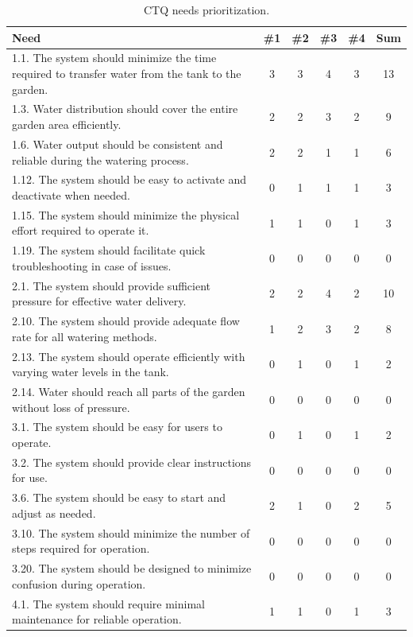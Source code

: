\documentclass[12pt]{report}
\begin{document}
\begin{table}[H]
\centering
\caption{ CTQ needs prioritization.}
\begin{tabular}{|p{10cm}|c|c|c|c|c|}
\hline
\textbf{Need} & \textbf{\#1} & \textbf{\#2} & \textbf{\#3} & \textbf{\#4} & \textbf{Sum} \\
\hline
1.1. The system should minimize the time required to transfer water from the tank to the garden. & 3 & 3 & 4 & 3 & 13 \cellcolor{yellow} \\
1.3. Water distribution should cover the entire garden area efficiently. & 2 & 2 & 3 & 2 & 9 \cellcolor{yellow} \\
1.6. Water output should be consistent and reliable during the watering process. & 2 & 2 & 1 & 1 & 6 \\
1.12. The system should be easy to activate and deactivate when needed. & 0 & 1 & 1 & 1 & 3 \\
1.15. The system should minimize the physical effort required to operate it. & 1 & 1 & 0 & 1 & 3 \\
1.19. The system should facilitate quick troubleshooting in case of issues. & 0 & 0 & 0 & 0 & 0 \\
\hline
2.1. The system should provide sufficient pressure for effective water delivery. & 2 & 2 & 4 & 2 & 10 \cellcolor{yellow} \\
2.10. The system should provide adequate flow rate for all watering methods. & 1 & 2 & 3 & 2 & 8 \cellcolor{yellow} \\
2.13. The system should operate efficiently with varying water levels in the tank. & 0 & 1 & 0 & 1 & 2 \\
2.14. Water should reach all parts of the garden without loss of pressure. & 0 & 0 & 0 & 0 & 0 \\
\hline
3.1. The system should be easy for users to operate. & 0 & 1 & 0 & 1 & 2 \\
3.2. The system should provide clear instructions for use. & 0 & 0 & 0 & 0 & 0 \\
3.6. The system should be easy to start and adjust as needed. & 2 & 1 & 0 & 2 & 5 \\
3.10. The system should minimize the number of steps required for operation. & 0 & 0 & 0 & 0 & 0 \\
3.20. The system should be designed to minimize confusion during operation. & 0 & 0 & 0 & 0 & 0 \\
\hline
4.1. The system should require minimal maintenance for reliable operation. & 1 & 1 & 0 & 1 & 3 \\

\end{tabular}
\end{table}
\end{document}
